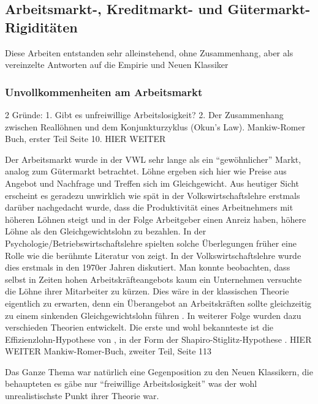 \subsection{Arbeitsmarkt-, Kreditmarkt- und Gütermarkt-Rigiditäten}
\label{drei Grunde}

Diese Arbeiten entstanden sehr alleinstehend, ohne Zusammenhang, aber als vereinzelte Antworten auf die Empirie und Neuen Klassiker



\subsubsection{Unvollkommenheiten am Arbeitsmarkt}

2 Gründe: 1. Gibt es unfreiwillige Arbeitslosigkeit? 2. Der Zusammenhang zwischen Reallöhnen und dem Konjunkturzyklus (Okun's Law). Mankiw-Romer Buch, erster Teil Seite 10.
HIER WEITER

Der Arbeitsmarkt wurde in der VWL sehr lange als ein "`gewöhnlicher"' Markt, analog zum Gütermarkt betrachtet. Löhne ergeben sich hier wie Preise aus Angebot und Nachfrage und Treffen sich im Gleichgewicht. Aus heutiger Sicht erscheint es geradezu unwirklich wie spät in der Volkswirtschaftslehre erstmals darüber nachgedacht wurde, dass die Produktivität eines Arbeitnehmers mit höheren Löhnen steigt und in der Folge Arbeitgeber einen Anreiz haben, höhere Löhne als den Gleichgewichtslohn zu bezahlen. In der Psychologie/Betriebswirtschaftslehre spielten solche Überlegungen früher eine Rolle wie die berühmte Literatur von \textcite{Maslow1943, Herzberg1966, McClelland1961, McGregor1960} zeigt. In der Volkswirtschaftslehre wurde dies erstmals in den 1970er Jahren diskutiert. Man konnte beobachten, dass selbst in Zeiten hohen Arbeitskräfteangebots kaum ein Unternehmen versuchte die Löhne ihrer Mitarbeiter zu kürzen. Dies wäre in der klassischen Theorie eigentlich zu erwarten, denn ein Überangebot an Arbeitskräften sollte gleichzeitig zu einem sinkenden Gleichgewichtslohn führen . In weiterer Folge wurden dazu verschieden Theorien\parencite{Yellen1984} entwickelt. Die erste und wohl bekannteste ist die Effizienzlohn-Hypothese von \textcite{Stiglitz1976}, in der Form der Shapiro-Stiglitz-Hypothese \parencite{ShapiroStiglitz1984}.
HIER WEITER Mankiw-Romer-Buch, zweiter Teil, Seite 113

Das Ganze Thema war natürlich eine Gegenposition zu den Neuen Klassikern, die behaupteten es gäbe nur "`freiwillige Arbeitslosigkeit"' was der wohl unrealistischste Punkt ihrer Theorie war.



